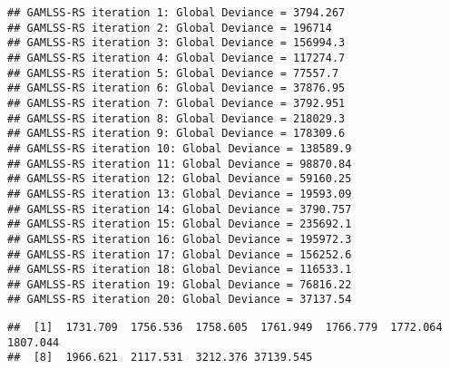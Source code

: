 \begin{Shaded}
\begin{Highlighting}[]
\OtherTok{\textless{}{-}} \SpecialCharTok{\textasciitilde{}} \NormalTok{, }
\end{Highlighting}
\end{Shaded}

\begin{verbatim}
## GAMLSS-RS iteration 1: Global Deviance = 3794.267 
## GAMLSS-RS iteration 2: Global Deviance = 196714 
## GAMLSS-RS iteration 3: Global Deviance = 156994.3 
## GAMLSS-RS iteration 4: Global Deviance = 117274.7 
## GAMLSS-RS iteration 5: Global Deviance = 77557.7 
## GAMLSS-RS iteration 6: Global Deviance = 37876.95 
## GAMLSS-RS iteration 7: Global Deviance = 3792.951 
## GAMLSS-RS iteration 8: Global Deviance = 218029.3 
## GAMLSS-RS iteration 9: Global Deviance = 178309.6 
## GAMLSS-RS iteration 10: Global Deviance = 138589.9 
## GAMLSS-RS iteration 11: Global Deviance = 98870.84 
## GAMLSS-RS iteration 12: Global Deviance = 59160.25 
## GAMLSS-RS iteration 13: Global Deviance = 19593.09 
## GAMLSS-RS iteration 14: Global Deviance = 3790.757 
## GAMLSS-RS iteration 15: Global Deviance = 235692.1 
## GAMLSS-RS iteration 16: Global Deviance = 195972.3 
## GAMLSS-RS iteration 17: Global Deviance = 156252.6 
## GAMLSS-RS iteration 18: Global Deviance = 116533.1 
## GAMLSS-RS iteration 19: Global Deviance = 76816.22 
## GAMLSS-RS iteration 20: Global Deviance = 37137.54
\end{verbatim}

\begin{Shaded}
\begin{Highlighting}[]
\OtherTok{\textless{}{-}} 

\OtherTok{\textless{}{-}} 
\end{Highlighting}
\end{Shaded}

\begin{verbatim}
##  [1]  1731.709  1756.536  1758.605  1761.949  1766.779  1772.064  1807.044
##  [8]  1966.621  2117.531  3212.376 37139.545
\end{verbatim}

